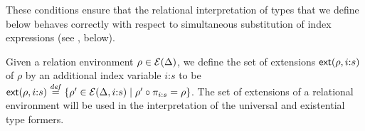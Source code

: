 
These conditions ensure that the relational interpretation of types
that we define below behaves correctly with respect to simultaneous
substitution of index expressions (see
, below). 


Given a relation environment $\rho \in \mathcal{E}(\Delta)$, we define
the set of extensions $\mathsf{ext}(\rho,i\mathord:s)$ of $\rho$ by an
additional index variable $i\mathord:s$ to be
$\mathsf{ext}(\rho,i\mathord:s) \stackrel{\mathit{def}}= \{ \rho' \in
\mathcal{E}(\Delta,i\mathord:s) \mathrel| \rho' \circ \pi_{i\mathord:s} =
\rho \}$. The set of extensions of a relational environment will be
used in the interpretation of the universal and existential type
formers.

